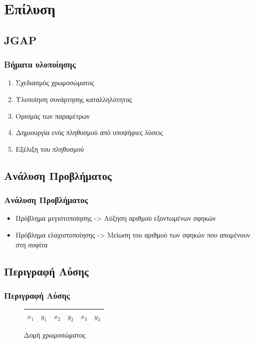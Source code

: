 \documentclass[xetex,mathserif,serif,14pt]{beamer}
\begin{document}
\section{Επίλυση}

\subsection{JGAP}

\begin{frame}
\frametitle{Βήματα υλοποίησης}
\begin{enumerate}
  \item Σχεδιασμός χρωμοσώματος\pause
  \item Υλοποίηση συνάρτησης καταλληλότητας\pause
  \item Ορισμός των παραμέτρων\pause
  \item Δημιουργία ενός πληθυσμού από υποψήφιες λύσεις\pause
  \item Εξέλιξη του πληθυσμού
\end{enumerate}
\end{frame}

\subsection{Ανάλυση Προβλήματος}

\begin{frame}
\frametitle{Ανάλυση Προβλήματος}
\begin{itemize}
  \item Πρόβλημα μεγιστοποίησης -> Αύξηση αριθμού εξοντωμένων σφηκών
  \item Πρόβλημα ελαχιστοποίησης -> Μείωση του αριθμού των σφηκών που απομένουν στη σοφίτα
\end{itemize}
\end{frame}

\subsection{Περιγραφή Λύσης}

\begin{frame}
\frametitle{Περιγραφή Λύσης}
\begin{figure}[!t]
    \centering
    \begin{tabular}{|c|c|c|c|c|c|}
        \hline
        $x_1$ & $y_1$ & $x_2$ & $y_2$ & $x_3$ & $y_3$\\
        \hline
    \end{tabular}
    \caption{Δομή χρωμοσώματος}
    \label{fig_chromosomeStructure}
\end{figure}
\end{frame}
\end{document}
